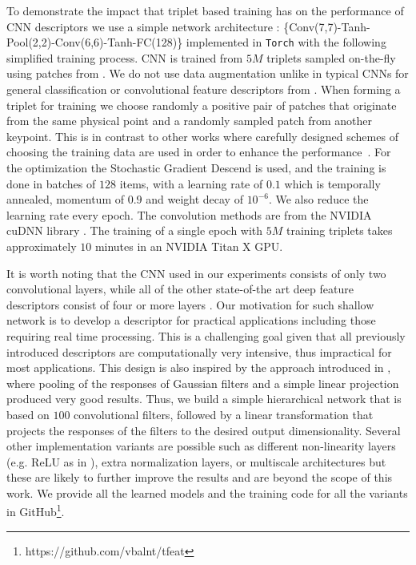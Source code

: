 To demonstrate the impact that triplet based training has on the performance of CNN descriptors we use a simple network architecture :
\{Conv(7,7)-Tanh-Pool(2,2)-Conv(6,6)-Tanh-FC(128)\} implemented in
\texttt{Torch} \cite{collobert:2011c} with the following simplified training process. 
CNN is trained from $5M$
triplets sampled on-the-fly using patches from
\cite{BHW10}. We do not use data
augmentation unlike in typical CNNs for general classification or convolutional feature descriptors from
\cite{ZagoruykoCVPR2015}\cite{Han_2015_CVPR}.  When forming a triplet for training we choose randomly a positive
pair of patches that originate from the same  physical point and  a
randomly sampled patch from another keypoint. This is in contrast to
other works where carefully designed schemes of choosing the training
data are used in order to enhance the
performance~\cite{DBLP:journals/corr/WangSLRWPCW14,Han_2015_CVPR}.
For the optimization the Stochastic Gradient Descend
\cite{bottou-tricks-2012} is used, and the training is done in batches
of $128$ items, with a learning rate of $0.1$ which is temporally
annealed, momentum of $0.9$ and weight decay of $10^{-6}$. We also
reduce the learning rate every epoch. The convolution methods are from
the NVIDIA cuDNN library \cite{DBLP:journals/corr/ChetlurWVCTCS14}.
The training of a single epoch with $5M$ training triplets takes
approximately $10$ minutes in an NVIDIA Titan X GPU.

It is worth noting that the CNN used in our experiments consists of
only two convolutional layers, while all of the other state-of-the art
deep feature descriptors consist of four or more layers
\cite{ZagoruykoCVPR2015,simo2015deepdesc,Han_2015_CVPR}.  Our
motivation for such shallow network is to develop a descriptor for
practical applications including those requiring real time
processing. This is a challenging goal given that all previously
introduced descriptors are computationally very intensive, thus
impractical for most applications.  This design is also inspired by
the approach introduced in \cite{simonyan2014learning}, where pooling
of the responses of Gaussian filters and a simple linear projection
produced very good results. Thus, we build a simple hierarchical
network that is based on $100$ convolutional filters, followed by a
linear transformation that projects the responses of the filters to
the desired output dimensionality.  Several other implementation
variants are possible such as different non-linearity layers
(e.g. ReLU as in \cite{Han_2015_CVPR,ZagoruykoCVPR2015}), extra
normalization layers, or multiscale architectures but these are likely
to further improve the results and are beyond the scope of this work.
We provide all the learned models and the training code for all the variants in GitHub\footnote{https://github.com/vbalnt/tfeat}. 

